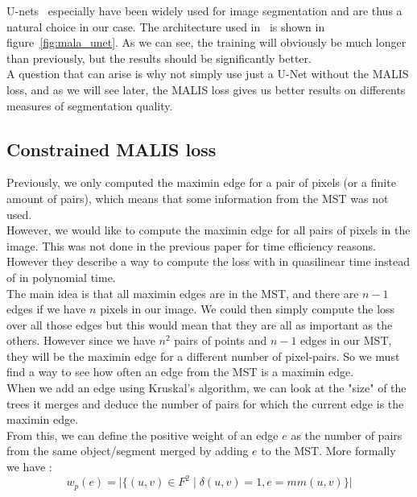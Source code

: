 U-nets~\cite{ronneberger_2015} especially have been widely used for image segmentation and are thus a
natural choice in our case. The architecture used in~\cite{funke_large_2019}
is shown in figure~\ref{fig:mala_unet}. As we can see, the training will
obviously be much longer than previously, but the results should be
significantly better.\\
A question that can arise is why not simply use just a U-Net without the MALIS
loss, and as we will see later, the MALIS loss gives us better results on
differents measures of segmentation quality.


\subsection{Constrained MALIS loss}

Previously, we only computed the maximin edge for a pair of pixels (or a finite
amount of pairs), which means that some information from the MST was not
used.\\
However, we would like to compute the maximin edge for all pairs of pixels in
the image. This was not done in the previous paper for time efficiency
reasons.\\
However they describe a way to compute the loss with in quasilinear time instead
of in polynomial time.\\

The main idea is that all maximin edges are in the MST, and there are $n-1$
edges if we have $n$ pixels in our image. We could then simply compute the loss
over all those edges but this would mean that they are all as important as the
others. However since we have $n^2$ pairs of points and $n-1$ edges in our MST,
they will be the maximin edge for a different number of pixel-pairs. So we must
find a way to see how often an edge from the MST is a maximin edge.\\

When we add an edge using Kruskal's algorithm, we can look at the "size" of the
trees it merges and deduce the number of pairs for which the current edge is
the maximin edge.\\

From this, we can define the positive weight of an edge $e$ as the number of pairs
from the same object/segment merged by adding $e$ to the MST. More formally we
have :
\begin{equation*}
	w_p(e)=\lvert \{(u,v)\in F^2 \;|\;\delta(u,v)=1, e=mm(u,v) \}   \rvert
\end{equation*}


